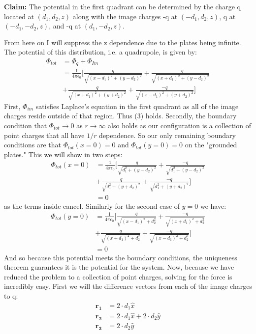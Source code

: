 \documentclass[a4paper, 11pt]{article}
\begin{document}
\textbf{Claim:} The potential in the first quadrant can be determined by the charge q located at $(d_1,d_2,z)$ along with the image charges -q  at $(-d_1, d_2, z)$, q at $(-d_1, -d_2, z)$, and -q at $(d_1, -d_2, z)$. 

From here on I will suppress the z dependence due to the plates being infinite. The potential of this distribution, i.e. a quadrupole, is given by: 
	\begin{align*}
		\Phi_{tot} &= \Phi_{q} + \Phi_{Im} \\ 
				   &= \frac{1}{4\pi\epsilon_0} \Bigg\lbrack \frac{q}{\sqrt{(x-d_1)^2+(y-d_2)^2}}+\frac{-q}{\sqrt{(x+d_1)^2+(y-d_2)^2}} \\
				   &+\frac{q}{\sqrt{(x+d_1)^2+(y+d_2)^2}}+\frac{-q}{\sqrt{(x-d_1)^2+(y+d_2)^2}} \Bigg\rbrack
	\end{align*}
First, $\Phi_{im}$ satisfies Laplace's equation in the first quadrant as all of the image charges reside outside of that region. Thus (3) holds. Secondly, the boundary condition that $\Phi_{tot} \rightarrow 0$ as $r \rightarrow \infty$ also holds as our configuration is a collection of point charges that all have $1/r$ dependence. So our only remaining boundary conditions are that $\Phi_{tot}(x=0) = 0$ and $\Phi_{tot}(y=0)=0$ on the "grounded plates." This we will show in two steps: 
	\begin{align*}
		\Phi_{tot}(x=0) &= \frac{1}{4\pi\epsilon_0} \Bigg\lbrack \frac{q}{\sqrt{d_1^2+(y-d_2)^2}}+\frac{-q}{\sqrt{d_1^2+(y-d_2)^2}} \\
		&+\frac{q}{\sqrt{d_1^2+(y+d_2)^2}}+\frac{-q}{\sqrt{d_1^2+(y+d_2)^2}} \Bigg\rbrack \\ 
		&= 0 
	\end{align*} 
as the terms inside cancel. Similarly for the second case of $y=0$ we have: 
	\begin{align*}
		\Phi_{tot}(y=0)&= \frac{1}{4\pi\epsilon_0} \Bigg\lbrack \frac{q}{\sqrt{(x-d_1)^2+d_2^2}}+\frac{-q}{\sqrt{(x+d_1)^2+d_2^2}} \\
		&+\frac{q}{\sqrt{(x+d_1)^2+d_2^2}}+\frac{-q}{\sqrt{(x-d_1)^2+d_2^2}} \Bigg\rbrack \\
		&=0
	\end{align*}
And so because this potential meets the boundary conditions, the uniqueness theorem guarantees it is the potential for the system. Now, because we have reduced the problem to a collection of point charges, solving for the force is incredibly easy. First we will the difference vectors from each of the image charges to q: 
	\begin{align*}
		\mathbf{r_1} &= 2 \cdot d_1 \hat{x} \\ 
		\mathbf{r_2} &= 2 \cdot d_1 \hat{x} + 2 \cdot d_2 \hat{y} \\  
		\mathbf{r_3} &= 2 \cdot d_2 \hat{y}
	\end{align*}
\end{document}
